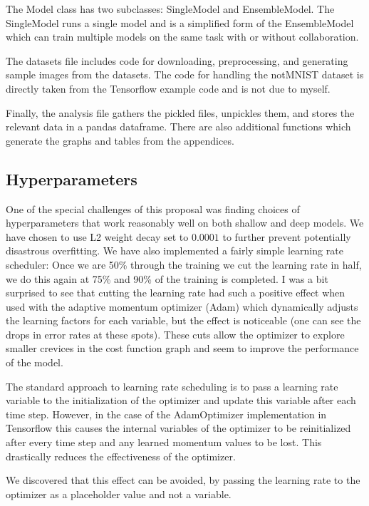 \documentclass[english,a4paper,oneside]{amsart}
\theoremstyle{definition}
\begin{document}
The Model class has two subclasses: SingleModel and EnsembleModel. The SingleModel runs a single model and is a simplified form of the EnsembleModel which can train multiple models on the same task with or without collaboration. 

The datasets file includes code for downloading, preprocessing, and generating sample images from the datasets. The code for handling the notMNIST dataset is directly taken from the Tensorflow example code and is not due to myself. 

Finally, the analysis file gathers the pickled files, unpickles them, and stores the relevant data in a pandas dataframe. There are also additional functions which generate the graphs and tables from the appendices.

\subsection{Hyperparameters}
One of the special challenges of this proposal was finding choices of hyperparameters that work reasonably well on both shallow and deep models. We have chosen to use L2 weight decay set to $0.0001$ to further prevent potentially disastrous overfitting. We have also implemented a fairly simple learning rate scheduler: Once we are 50\% through the training we cut the learning rate in half, we do this again at 75\% and 90\% of the training is completed. I was a bit surprised to see that cutting the learning rate had such a positive effect when used with the adaptive momentum optimizer (Adam) which dynamically adjusts the learning factors for each variable, but the effect is noticeable (one can see the drops in error rates at these spots). These cuts allow the optimizer to explore smaller crevices in the cost function graph and seem to improve the performance of the model.

\begin{remark}
	The standard approach to learning rate scheduling is to pass a learning rate variable to the initialization of the optimizer and update this variable after each time step. However, in the case of the AdamOptimizer implementation in Tensorflow this causes the internal variables of the optimizer to be reinitialized after every time step and any learned momentum values to be lost. This drastically reduces the effectiveness of the optimizer. 

	We discovered that this effect can be avoided, by passing the learning rate to the optimizer as a placeholder value and not a variable.
\end{remark}
\end{document}
